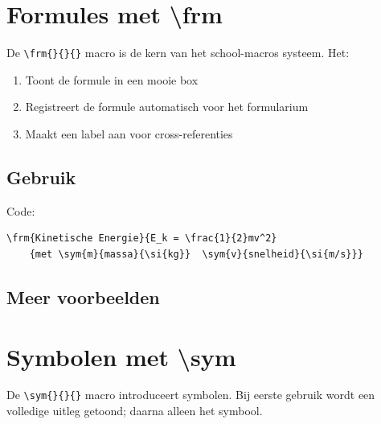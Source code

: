 \documentclass[a4paper,11pt]{article}
\begin{document}
\section{Formules met \textbackslash frm}
\label{sec:formulas}

De \verb|\frm{}{}{}| macro is de kern van het school-macros systeem. Het:
\begin{enumerate}
    \item Toont de formule in een mooie box
    \item Registreert de formule automatisch voor het formularium
    \item Maakt een label aan voor cross-referenties
\end{enumerate}

\subsection{Gebruik}


Code:
\begin{verbatim}
\frm{Kinetische Energie}{E_k = \frac{1}{2}mv^2}
    {met \sym{m}{massa}{\si{kg}}  \sym{v}{snelheid}{\si{m/s}}}
\end{verbatim}

\subsection{Meer voorbeelden}



\section{Symbolen met \textbackslash sym}
\label{sec:symbols}

De \verb|\sym{}{}{}| macro introduceert symbolen. Bij eerste gebruik wordt een volledige uitleg getoond; daarna alleen het symbool.
\end{document}
